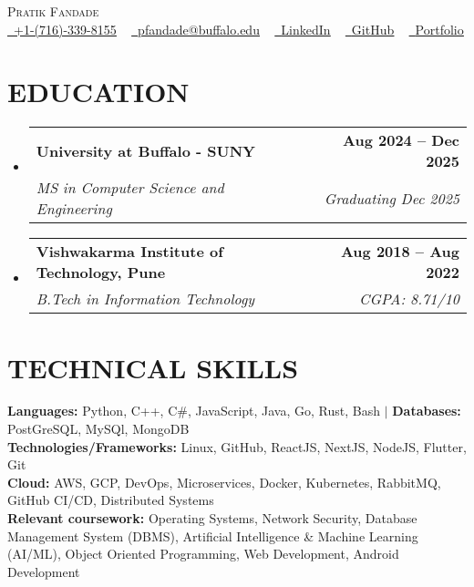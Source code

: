 \documentclass[letterpaper,10pt]{article}
\makeatletter
\newcommand{\resumeSubheading}[4]{
  \vspace{2pt}\item
    \begin{tabular*}{1.0\textwidth}[t]{l@{\extracolsep{\fill}}r}
      \textbf{\large#1} & \textbf{\normalsize #2} \\
      \textit{\large#3} & \textit{\small #4} \\
    \end{tabular*}\vspace{-7pt}
}
\newcommand{\resumeSubHeadingListStart}{\begin{itemize}[leftmargin=0.0in, label={}]}
\newcommand{\resumeSubHeadingListEnd}{\end{itemize}}
\makeatother
\begin{document}
\begin{center}
    {\huge \scshape Pratik Fandade} \\
    \href{tel:+17163398155}{\raisebox{-0.1\height}\faPhone\ \underline{+1-(716)-339-8155}} ~
    \href{mailto:pfandade@buffalo.edu}{\raisebox{-0.2\height}\faEnvelope\ \underline{pfandade@buffalo.edu}} ~ 
    \href{https://linkedin.com/in/pratikfandade}{\raisebox{-0.2\height}\faLinkedinSquare\ \underline{LinkedIn}} ~
    \href{https://github.com/prkbuilds}{\raisebox{-0.2\height}\faGithub\ \underline{GitHub}} ~
    \href{https://pratikfandade.vercel.app/}{\raisebox{-0.2\height}\faGlobe\ \underline{Portfolio}}
\end{center}
\vspace{-10pt}
\section{EDUCATION}
\resumeSubHeadingListStart
    \resumeSubheading {University at Buffalo - SUNY}{Aug 2024 -- Dec 2025}
    {MS in Computer Science and Engineering}{Graduating Dec 2025}
    \resumeSubheading {Vishwakarma Institute of Technology, Pune}{Aug 2018 -- Aug 2022}
    {B.Tech in Information Technology}{CGPA: 8.71/10}
\resumeSubHeadingListEnd
\vspace{-10pt}
\section{TECHNICAL SKILLS}
\begin{itemize}[leftmargin=0.15in, label={}]
    \small{\item{
        \textbf{\normalsize{Languages:}}{ \normalsize{Python, C++, C\#, JavaScript, Java, Go, Rust, Bash}} $|$ \textbf{\normalsize{Databases:}}{ \normalsize{PostGreSQL, MySQl, MongoDB}} \\
        \textbf{\normalsize{Technologies/Frameworks:}}{\normalsize{ Linux, GitHub, ReactJS, NextJS, NodeJS, Flutter, Git }} \\
        \textbf{\normalsize{Cloud:}}{ \normalsize{ AWS, GCP, DevOps, Microservices, Docker, Kubernetes, RabbitMQ, GitHub CI/CD, Distributed Systems }} \\
        \textbf{\normalsize{Relevant coursework:}}{\normalsize{ Operating Systems, Network Security, Database Management System (DBMS), Artificial Intelligence \& Machine Learning (AI/ML), Object Oriented Programming, Web Development, Android Development }} \\
    }}
\end{itemize}
\vspace{-15pt}
\end{document}
